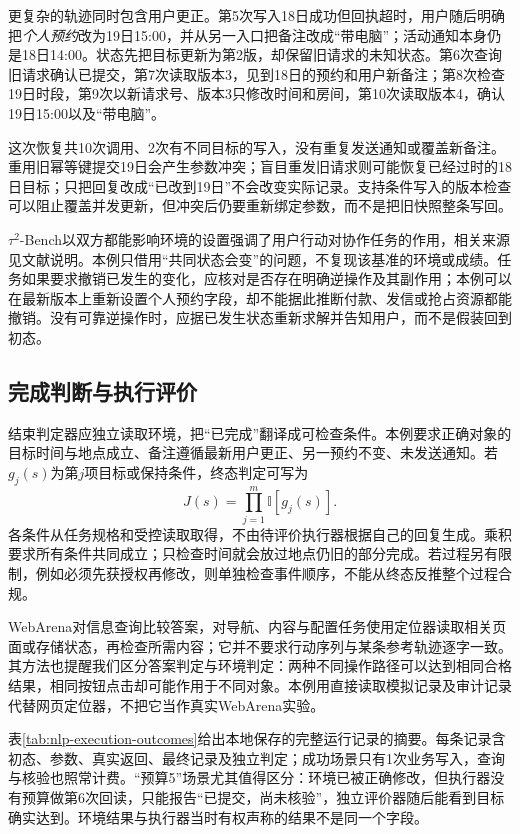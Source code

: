 更复杂的轨迹同时包含用户更正。第5次写入18日成功但回执超时，用户随后明确把\emph{个人预约}改为19日15:00，并从另一入口把备注改成“带电脑”；活动通知本身仍是18日14:00。状态先把目标更新为第2版，却保留旧请求的未知状态。第6次查询旧请求确认已提交，第7次读取版本3，见到18日的预约和用户新备注；第8次检查19日时段，第9次以新请求号、版本3只修改时间和房间，第10次读取版本4，确认19日15:00以及“带电脑”。

这次恢复共10次调用、2次有不同目标的写入，没有重复发送通知或覆盖新备注。重用旧幂等键提交19日会产生参数冲突；盲目重发旧请求则可能恢复已经过时的18日目标；只把回复改成“已改到19日”不会改变实际记录。支持条件写入的版本检查可以阻止覆盖并发更新，但冲突后仍要重新绑定参数，而不是把旧快照整条写回。

$\tau^2$-Bench以双方都能影响环境的设置强调了用户行动对协作任务的作用，相关来源见文献说明。本例只借用“共同状态会变”的问题，不复现该基准的环境或成绩。任务如果要求撤销已发生的变化，应核对是否存在明确逆操作及其副作用；本例可以在最新版本上重新设置个人预约字段，却不能据此推断付款、发信或抢占资源都能撤销。没有可靠逆操作时，应据已发生状态重新求解并告知用户，而不是假装回到初态。

\subsection{完成判断与执行评价}
\label{sec:nlp-execution-completion}

结束判定器应独立读取环境，把“已完成”翻译成可检查条件。本例要求正确对象的目标时间与地点成立、备注遵循最新用户更正、另一预约不变、未发送通知。若$g_j(s)$为第$j$项目标或保持条件，终态判定可写为
\[
 J(s)=\prod_{j=1}^{m}\mathbb{I}[g_j(s)].
\]
各条件从任务规格和受控读取取得，不由待评价执行器根据自己的回复生成。乘积要求所有条件共同成立；只检查时间就会放过地点仍旧的部分完成。若过程另有限制，例如必须先获授权再修改，则单独检查事件顺序，不能从终态反推整个过程合规。

WebArena对信息查询比较答案，对导航、内容与配置任务使用定位器读取相关页面或存储状态，再检查所需内容；它并不要求行动序列与某条参考轨迹逐字一致。其方法也提醒我们区分答案判定与环境判定：两种不同操作路径可以达到相同合格结果，相同按钮点击却可能作用于不同对象。本例用直接读取模拟记录及审计记录代替网页定位器，不把它当作真实WebArena实验。

表\ref{tab:nlp-execution-outcomes}给出本地保存的完整运行记录的摘要。每条记录含初态、参数、真实返回、最终记录及独立判定；成功场景只有1次业务写入，查询与核验也照常计费。“预算5”场景尤其值得区分：环境已被正确修改，但执行器没有预算做第6次回读，只能报告“已提交，尚未核验”，独立评价器随后能看到目标确实达到。环境结果与执行器当时有权声称的结果不是同一个字段。

